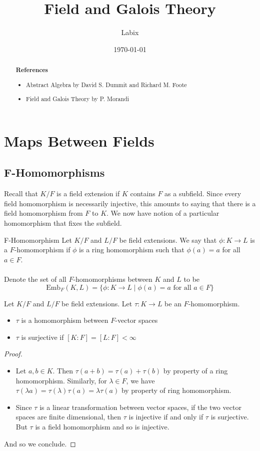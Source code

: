 \documentclass[a4paper]{article}
\title{Field and Galois Theory}
\author{Labix}
\date{\today}
\begin{document}
\maketitle
\begin{abstract}

\textbf{References}
\begin{itemize}
\item Abstract Algebra by David S. Dummit and Richard M. Foote
\item Field and Galois Theory by P. Morandi
\end{itemize}
\end{abstract}
\pagebreak
\tableofcontents
\pagebreak

\section{Maps Between Fields}
\subsection{F-Homomorphisms}
Recall that $K/F$ is a field extension if $K$ contains $F$ as a subfield. Since every field homomorphism is necessarily injective, this amounts to saying that there is a field homomorphism from $F$ to $K$. We now have notion of a particular homomorphism that fixes the subfield. 

\begin{defn}{F-Homomorphism}{} Let $K/F$ and $L/F$ be field extensions. We say that $\phi:K\to L$ is a $F$-homomorphism if $\phi$ is a ring homomorphism such that $\phi(a)=a$ for all $a\in F$. \\~\\
Denote the set of all $F$-homomorphisms between $K$ and $L$ to be $$\text{Emb}_F(K,L)=\{\phi:K\to L\;|\;\phi(a)=a\text{ for all }a\in F\}$$
\end{defn}

\begin{prp}{}{} Let $K/F$ and $L/F$ be field extensions. Let $\tau:K\to L$ be an $F$-homomorphism. 
\begin{itemize}
\item $\tau$ is a homomorphism between $F$-vector spaces
\item $\tau$ is surjective if $[K:F]=[L:F]<\infty$
\end{itemize} \tcbline
\begin{proof}~\\
\begin{itemize}
\item Let $a,b\in K$. Then $\tau(a+b)=\tau(a)+\tau(b)$ by property of a ring homomorphism. Similarly, for $\lambda\in F$, we have $\tau(\lambda a)=\tau(\lambda)\tau(a)=\lambda\tau(a)$ by property of ring homomorphism. 
\item Since $\tau$ is a linear transformation between vector spaces, if the two vector spaces are finite dimensional, then $\tau$ is injective if and only if $\tau$ is surjective. But $\tau$ is a field homomorphism and so is injective. 
\end{itemize}
And so we conclude. 
\end{proof}
\end{prp}
\end{document}

